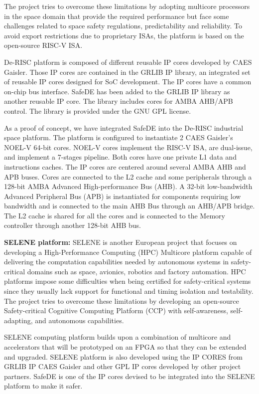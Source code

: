The project tries to overcome these limitations by adopting multicore processors in the space domain that provide the required performance but face some challenges related to space safety regulations, predictability and reliability. To avoid export restrictions due to proprietary ISAs, the platform is based on the open-source RISC-V ISA. 

De-RISC platform is composed of different reusable IP cores developed by CAES Gaisler. Those IP cores are contained in the GRLIB IP library, an integrated set of reusable IP cores designed for SoC development. The IP cores have a common on-chip bus interface. SafeDE has been added to the GRLIB IP library as another reusable IP core. The library includes cores for AMBA AHB/APB control. The library is provided under the GNU GPL license.

As a proof of concept, we have integrated SafeDE into the De-RISC industrial space platform. The platform is configured to instantiate 2 CAES Gaisler's NOEL-V 64-bit cores. NOEL-V cores implement the RISC-V ISA, are dual-issue, and implement a 7-stages pipeline. Both cores have one private L1 data and instructions caches. The IP cores are centered around several AMBA AHB and APB buses. Cores are connected to the L2 cache and some peripherals through a 128-bit AMBA Advanced High-performance Bus (AHB). A 32-bit low-bandwidth Advanced Peripheral Bus (APB) is instantiated for components requiring low bandwidth and is connected to the main AHB Bus through an AHB/APB bridge. The L2 cache is shared for all the cores and is connected to the Memory controller through another 128-bit AHB bus.


\textbf{SELENE platform:} SELENE \cite{SELENEgit} is another European project that focuses on developing a High-Performance Computing (HPC) Multicore platform capable of delivering the computation capabilities needed by autonomous systems in safety-critical domains such as space, avionics, robotics and factory automation. HPC platforms impose some difficulties when being certified for safety-critical systems since they usually lack support for functional and timing isolation and testability. The project tries to overcome these limitations by developing an open-source Safety-critical Cognitive Computing Platform (CCP) with self-awareness, self-adapting, and autonomous capabilities. 

SELENE computing platform builds upon a combination of multicore and accelerators that will be prototyped on an FPGA so that they can be extended and upgraded. SELENE platform is also developed using the IP CORES from GRLIB IP CAES Gaisler and other GPL IP cores developed by other project partners. SafeDE is one of the IP cores devised to be integrated into the SELENE platform to make it safer.

